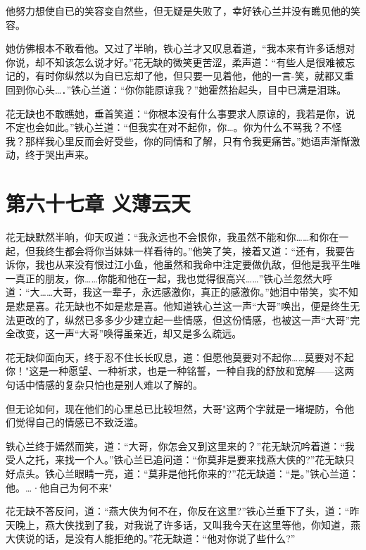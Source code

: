 \documentclass[12pt,oneside]{book}
\begin{document}
他努力想使自已的笑容变自然些，但无疑是失败了，幸好铁心兰并没有瞧见他的笑容。

她仿佛根本不敢看他。又过了半晌，铁心兰才又叹息着道，``我本来有许多话想对你说，却不知该怎么说才好。''花无缺的微笑更苦涩，柔声道：``有些人是很难被忘记的，有时你纵然以为自已忘却了他，但只要一见着他，他的一言-笑，就都又重回到你心头\ldots．''铁心兰道：``你你能原谅我？''她霍然抬起头，目中已满是泪珠。

花无缺也不敢瞧她，垂首笑道：``你根本没有什么事要求人原谅的，我若是你，说不定也会如此。''铁心兰道：``但我实在对不起你，你\ldots。你为什么不骂我？不怪我？那样我心里反而会好受些，你的同情和了解，只有令我更痛苦。''她语声渐惭激动，终于哭出声来。

\hypertarget{ux7b2cux516dux5341ux4e03ux7ae0-ux4e49ux8584ux4e91ux5929}{%
\chapter{第六十七章
义薄云天}\label{ux7b2cux516dux5341ux4e03ux7ae0-ux4e49ux8584ux4e91ux5929}}

花无缺默然半晌，仰天叹道：``我永远也不会恨你，我虽然不能和你\ldots\ldots 和你在一起，但我终生都会将你当妹妹一样看待的。''他笑了笑，接着又道：``还有，我要告诉你，我也从来没有恨过江小鱼，他虽然和我命中注定要做仇敌，但他是我平生唯一真正的朋友，你\ldots\ldots 你能和他在一起，我也觉得很高兴\ldots\ldots{}''铁心兰忽然大呼道：``大\ldots\ldots 大哥，我这一辈子，永远感激你，真正的感激你。''她泪中带笑，实不知是悲是喜。花无缺也不如是悲是喜。他知道铁心兰这一声``大哥''唤出，便是终生无法更改的了，纵然已多多少少建立起一些情感，但这份情感，也被这一声``大哥''完全改变，这一声``大哥''唤得虽亲近，却又是多么疏远。

花无缺仰面向天，终于忍不住长长叹息，道：但愿他莫要对不起你\ldots\ldots 莫要对不起你！"这是一种愿望、一种祈求，也是一种铭誓，一种自我的舒放和宽解------这两句话中情感的复杂只怕也是别人难以了解的。

但无论如何，现在他们的心里总已比较坦然，大哥"这两个字就是一堵堤防，令他们觉得自己的情感已不致泛滥。

铁心兰终于嫣然而笑，道：``大哥，你怎会又到这里来的？''花无缺沉吟着道：``我受人之托，来找一个人。''铁心兰已追问道：``你莫非是要来找燕大侠的?''花无缺只好点头。铁心兰眼睛一亮，道：``莫非是他托你来的?''花无缺道：``是。''铁心兰道：他。\ldots·他自己为何不来"

花无缺不答反问，道：``燕大侠为何不在，你反在这里?''铁心兰垂下了头，道：``昨天晚上，燕大侠找到了我，对我说了许多话，又叫我今天在这里等他，你知道，燕大侠说的话，是没有人能拒绝的。''花无缺道：``他对你说了些什么?''
\end{document}
